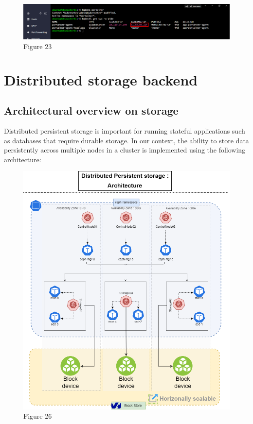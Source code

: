 \begin{enumerate}[label = (\alph*)]
\begin{itemize}[label={--}]
        \begin{figure}[H]\centering
        \includegraphics[width=1.0\textwidth,angle=00]{assets/f23.png}
        \caption{Figure 23 }
        \label{fig:f23}
        \end{figure}
        
    \end{itemize}

\end{enumerate}

\section{Distributed storage backend}

\subsection{Architectural overview on storage}

Distributed persistent storage is important for running stateful applications such as databases that require durable storage. In our context, the ability to store data persistently across multiple nodes in a cluster is implemented using the following architecture: 

\begin{figure}[H]\centering
\includegraphics[width=1.0\textwidth,angle=00]{assets/f26.png}
\caption{Figure 26 }
\label{fig:f26}
\end{figure}


